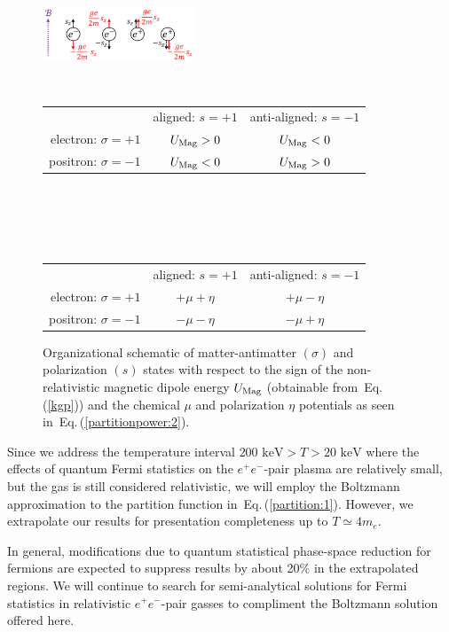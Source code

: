 \documentclass[aps,prd,floatfix,reprint]{revtex4-2}
\newcommand*{\keV}{\text{ keV}}
\newcommand{\req}[1]{Eq.\,(\ref{#1})}
\newcommand\Tstrut{\rule{0pt}{2.6ex}} %
\newcommand\Bstrut{\rule[-0.9ex]{0pt}{0pt}} %
\newcommand{\TBstrut}{\Tstrut\Bstrut} %
\begin{document}
\begin{figure}[ht]
 \centering
 \includegraphics[width=0.4\textwidth]{plots/schematic.png}\Bstrut\\
 \begin{tabular}{ r|c|c| }
 \multicolumn{1}{r}{}
 & \multicolumn{1}{c}{aligned: $s=+1$}
 & \multicolumn{1}{c}{anti-aligned: $s=-1$} \\
 \cline{2-3}
 electron: $\sigma=+1$ & $U_{\rm Mag}>0$ & $U_{\rm Mag}<0$ \TBstrut\\
 \cline{2-3}
 positron: $\sigma=-1$ & $U_{\rm Mag}<0$ & $U_{\rm Mag}>0$ \TBstrut\\
 \cline{2-3}
 \end{tabular}\\\,\TBstrut\\
 \begin{tabular}{ r|c|c| }
 \multicolumn{1}{r}{}
 & \multicolumn{1}{c}{aligned: $s=+1$}
 & \multicolumn{1}{c}{anti-aligned: $s=-1$} \\
 \cline{2-3}
 electron: $\sigma=+1$ & $+\mu+\eta$ & $+\mu-\eta$ \TBstrut\\
 \cline{2-3}
 positron: $\sigma=-1$ & $-\mu-\eta$ & $-\mu+\eta$ \TBstrut\\
 \cline{2-3}
 \end{tabular}
 \caption{Organizational schematic of matter-antimatter $(\sigma)$ and polarization $(s)$ states with respect to the sign of the non-relativistic magnetic dipole energy $U_{\rm Mag}$ (obtainable from~\req{kgp}) and the chemical $\mu$ and polarization $\eta$ potentials as seen in~\req{partitionpower:2}.}
 \label{fig:schematic}
\end{figure}

Since we address the temperature interval $200\keV>T>20\keV$ where the effects of quantum Fermi statistics on the $e^{+}e^{-}$-pair plasma are relatively small, but the gas is still considered relativistic, we will employ the Boltzmann approximation to the partition function in~\req{partition:1}. However, we extrapolate our results for presentation completeness up to $T\simeq 4m_{e}$.

In general, modifications due to quantum statistical phase-space reduction for fermions are expected to suppress results by about 20\% in the extrapolated regions. We will continue to search for semi-analytical solutions for Fermi statistics in relativistic $e^{+}e^{-}$-pair gasses to compliment the Boltzmann solution offered here. 
\end{document}
